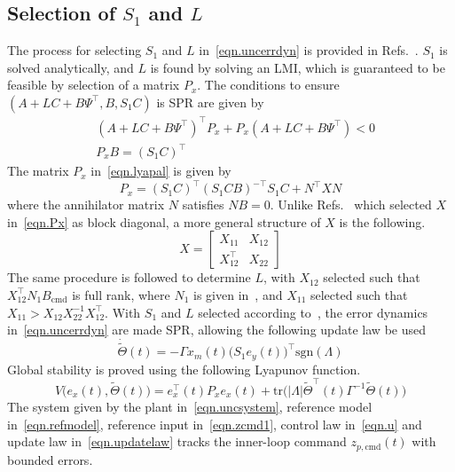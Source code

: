 \documentclass[journal]{IEEEtran}
\theoremstyle{innercustomthm}
\begin{document}
  \subsection{Selection of \texorpdfstring{$S_{1}$}{S1} and \texorpdfstring{$L$}{L}}

  The process for selecting $S_{1}$ and $L$ in\ \eqref{eqn.uncerrdyn} is provided in Refs.\ \cite{wiese.gnc.2015, wiese.jgcd.2015}.
  $S_{1}$ is solved analytically, and $L$ is found by solving an LMI, which is guaranteed to be feasible by selection of a matrix $P_{x}$.
  The conditions to ensure $(A+LC+B\Psi^{\top},B,S_{1}C)$ is SPR are given by
  {%
    \small
    \begin{align}
      \label{eqn.lyapal}
      &(A+LC+B\Psi^{\top})^{\top}P_{x}+P_{x}(A+LC+B\Psi^{\top}) < 0 \\
      \label{eqn.S1CB}
      &P_{x}B = (S_{1}C)^{\top}
    \end{align}
  }%
  The matrix $P_{x}$ in\ \eqref{eqn.lyapal} is given by
  \begin{equation}
    \label{eqn.Px}
    P_{x} = (S_{1}C)^{\top}(S_{1}CB)^{-\top}S_{1}C+N^{\top}XN
  \end{equation}
  where the annihilator matrix $N$ satisfies $NB=0$.
  Unlike Refs.\ \cite{wiese.gnc.2015, wiese.jgcd.2015} which selected $X$ in\ \eqref{eqn.Px} as block diagonal, a more general structure of $X$ is the following.
  \begin{equation}
    \label{eqn.Xpartition}
    X=
    \begin{bmatrix}
      X_{11} & X_{12} \\
      X_{12}^{\top} & X_{22}
    \end{bmatrix}
  \end{equation}
  The same procedure is followed to determine $L$, with $X_{12}$ selected such that $X_{12}^{\top}N_{1}B_{\text{cmd}}$ is full rank, where $N_{1}$ is given in\ \cite{wiese.gnc.2015, wiese.jgcd.2015}, and $X_{11}$ selected such that $X_{11}>X_{12}X_{22}^{-1}X_{12}^{\top}$.
  With $S_{1}$ and $L$ selected according to\ \cite{wiese.gnc.2015, wiese.jgcd.2015}, the error dynamics in\ \eqref{eqn.uncerrdyn} are made SPR, allowing the following update law be used
  \begin{equation}
    \label{eqn.updatelaw}
    \dot{\widetilde{\Theta}}(t) = -\Gamma x_{m}(t)\bigr(S_{1}e_{y}(t)\bigr)^{\top}\text{sgn}(\Lambda)
  \end{equation}
  Global stability is proved using the following Lyapunov function.
  {\small
  \begin{equation}
    \label{eqn.lyapfunction}
    V\bigr(e_{x}(t),\widetilde{\Theta}(t)\bigr) = e_{x}^{\top}(t)P_{x}e_{x}(t)+\text{tr}\bigr(|\Lambda|\widetilde{\Theta}^{\top}(t)\Gamma^{-1}\widetilde{\Theta}(t)\bigr)
  \end{equation}
  }%
  The system given by the plant in\ \eqref{eqn.uncsystem}, reference model in\ \eqref{eqn.refmodel}, reference input in\ \eqref{eqn.zcmd1}, control law in\ \eqref{eqn.u} and update law in\ \eqref{eqn.updatelaw} tracks the inner-loop command $z_{p,\text{cmd}}(t)$ with bounded errors.
\end{document}
